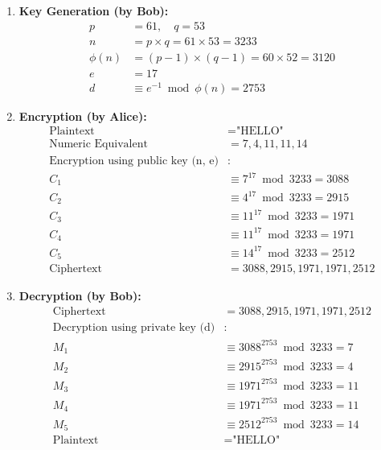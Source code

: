 \documentclass{article}
\begin{document}
\begin{enumerate}
    \item \textbf{Key Generation (by Bob):}
        \begin{align*}
            p &= 61, \quad q = 53 \\
            n &= p \times q = 61 \times 53 = 3233 \\
            \phi(n) &= (p-1) \times (q-1) = 60 \times 52 = 3120 \\
            e &= 17 \\
            d &\equiv e^{-1} \bmod \phi(n) = 2753
        \end{align*}
    \item \textbf{Encryption (by Alice):}
        \begin{align*}
            \text{Plaintext} &= \text{"HELLO"} \\
            \text{Numeric Equivalent} &= 7, 4, 11, 11, 14 \\
            \text{Encryption using public key (n, e)} &: \\
            C_1 &\equiv 7^{17} \bmod 3233 = 3088 \\
            C_2 &\equiv 4^{17} \bmod 3233 = 2915 \\
            C_3 &\equiv 11^{17} \bmod 3233 = 1971 \\
            C_4 &\equiv 11^{17} \bmod 3233 = 1971 \\
            C_5 &\equiv 14^{17} \bmod 3233 = 2512 \\
            \text{Ciphertext} &= 3088, 2915, 1971, 1971, 2512
        \end{align*}
    \item \textbf{Decryption (by Bob):}
        \begin{align*}
            \text{Ciphertext} &= 3088, 2915, 1971, 1971, 2512 \\
            \text{Decryption using private key (d)} &: \\
            M_1 &\equiv 3088^{2753} \bmod 3233 = 7 \\
            M_2 &\equiv 2915^{2753} \bmod 3233 = 4 \\
            M_3 &\equiv 1971^{2753} \bmod 3233 = 11 \\
            M_4 &\equiv 1971^{2753} \bmod 3233 = 11 \\
            M_5 &\equiv 2512^{2753} \bmod 3233 = 14 \\
            \text{Plaintext} &= \text{"HELLO"}
        \end{align*}
\end{enumerate}
\end{document}
